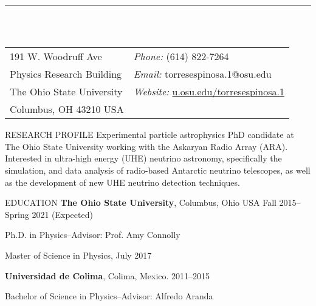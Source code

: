 \documentclass{resume} %
\newenvironment{list1}{
  \begin{list}{\ding{113}}{%
      \setlength{\itemsep}{0in}
      \setlength{\parsep}{0in} \setlength{\parskip}{0in}
      \setlength{\topsep}{0in} \setlength{\partopsep}{0in} 
      \setlength{\leftmargin}{0.17in}}}{\end{list}}
\begin{document}

\vspace{-1cm}
\rule{\textwidth}{0.1cm} \\ \\
\begin{tabular}{@{}p{2in}p{4in}}
191 W. Woodruff Ave             & {\it Phone:}  (614) 822-7264\\            
Physics Research Building   & {\it Email:}  torresespinosa.1@osu.edu \\         
The Ohio State University  & {\it Website:} \url{u.osu.edu/torresespinosa.1}  \\       
Columbus, OH  43210 USA  \\     
\end{tabular}


\begin{rSection}{RESEARCH PROFILE}
Experimental particle astrophysics PhD candidate at The Ohio State University working with the Askaryan Radio Array (ARA). Interested in ultra-high energy (UHE) neutrino astronomy, specifically the simulation, and data analysis of radio-based Antarctic neutrino telescopes, as well as the development of new UHE neutrino detection techniques.
\end{rSection}


\begin{rSection}{EDUCATION}
\textbf{The Ohio State University}, Columbus, Ohio USA \hfill Fall 2015--Spring 2021 (Expected)\\
\vspace*{-.15in}
\begin{list1}
\item[] Ph.D. in Physics--Advisor: Prof. Amy Connolly
\item [] Master of Science in Physics, July 2017
\end{list1}

\textbf{Universidad de Colima}, Colima, Mexico. \hfill 2011--2015\\
\vspace*{-.15in}
\begin{list1}
\item[] Bachelor of Science in Physics--Advisor: Alfredo Aranda
\end{list1}
\end{rSection}
\end{document}
